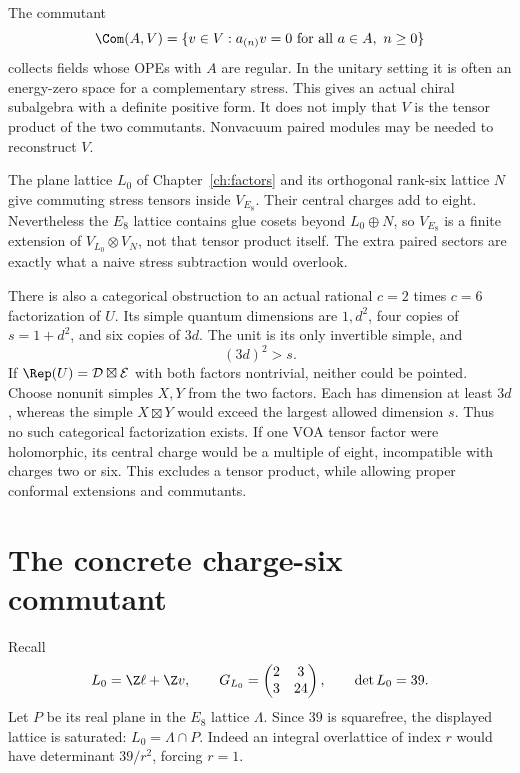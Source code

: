 The commutant
\[
 \Com(A,V)=\{v\in V:a_{(n)}v=0
                       \text{ for all }a\in A,\ n\geq0\}
\]
collects fields whose OPEs with $A$ are regular. In the unitary
setting it is often an energy-zero space for a complementary stress.
This gives an actual chiral subalgebra with a definite positive form.
It does not imply that $V$ is the tensor product of the two
commutants. Nonvacuum paired modules may be needed to reconstruct $V$.

\begin{example}
The plane lattice $L_0$ of Chapter~\ref{ch:factors} and its orthogonal
rank-six lattice $N$ give commuting stress tensors inside $V_{E_8}$.
Their central charges add to eight. Nevertheless the $E_8$ lattice
contains glue cosets beyond $L_0\oplus N$, so
$V_{E_8}$ is a finite extension of $V_{L_0}\otimes V_N$, not that
tensor product itself. The extra paired sectors are exactly what a
naive stress subtraction would overlook.
\end{example}

There is also a categorical obstruction to an actual rational
$c=2$ times $c=6$ factorization of $U$. Its simple quantum dimensions
are $1,d^2$, four copies of $s=1+d^2$, and six copies of $3d$.
The unit is its only invertible simple, and
\[
 (3d)^2>s.
\]
If $\Rep(U)=\mathcal D\boxtimes\mathcal E$ with both factors
nontrivial, neither could be pointed. Choose nonunit simples $X,Y$
from the two factors. Each has dimension at least $3d$, whereas the
simple $X\boxtimes Y$ would exceed the largest allowed dimension $s$.
Thus no such categorical factorization exists. If one VOA tensor
factor were holomorphic, its central charge would be a multiple of
eight, incompatible with charges two or six. This excludes a tensor
product, while allowing proper conformal extensions and commutants.

\section{The concrete charge-six commutant}

Recall
\[
 L_0=\Z\ell+\Z v,
 \qquad G_{L_0}=\begin{pmatrix}2&3\\3&24\end{pmatrix},
 \qquad\det L_0=39.
\]
Let $P$ be its real plane in the $E_8$ lattice $\Lambda$. Since
$39$ is squarefree, the displayed lattice is saturated:
$L_0=\Lambda\cap P$. Indeed an integral overlattice of index $r$
would have determinant $39/r^2$, forcing $r=1$.

